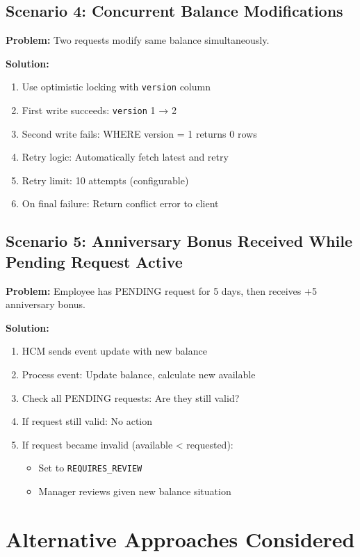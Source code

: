 \documentclass[12pt,a4paper]{article}
\begin{document}
\subsection{Scenario 4: Concurrent Balance Modifications}

\textbf{Problem:} Two requests modify same balance simultaneously.

\textbf{Solution:}
\begin{enumerate}
    \item Use optimistic locking with \texttt{version} column
    \item First write succeeds: \texttt{version} 1 → 2
    \item Second write fails: WHERE version = 1 returns 0 rows
    \item Retry logic: Automatically fetch latest and retry
    \item Retry limit: 10 attempts (configurable)
    \item On final failure: Return conflict error to client
\end{enumerate}

\subsection{Scenario 5: Anniversary Bonus Received While Pending Request Active}

\textbf{Problem:} Employee has PENDING request for 5 days, then receives +5 anniversary bonus.

\textbf{Solution:}
\begin{enumerate}
    \item HCM sends event update with new balance
    \item Process event: Update balance, calculate new available
    \item Check all PENDING requests: Are they still valid?
    \item If request still valid: No action
    \item If request became invalid (available < requested): 
        \begin{itemize}
            \item Set to \texttt{REQUIRES\_REVIEW}
            \item Manager reviews given new balance situation
        \end{itemize}
\end{enumerate}

\newpage

\section{Alternative Approaches Considered}
\end{document}
